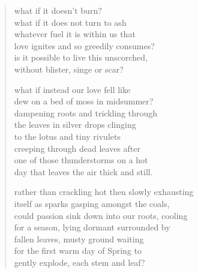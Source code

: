 \begin{verse}
what if it doesn't burn? \\
what if it does not turn to ash  \\
whatever fuel it is within us that  \\
love ignites and so greedily consumes? \\
is it possible to live this unscorched, \\
without blister, singe or scar? 

what if instead our love fell like \\
dew on a bed of moss in midsummer? \\
dampening roots and trickling through \\
the leaves in silver drops clinging  \\
to the lotus and tiny rivulets \\
creeping through dead leaves after  \\
one of those thunderstorms on a hot \\
day that leaves the air thick and still. 

rather than crackling hot then slowly exhausting \\
itself as sparks gasping amongst the coals, \\
could passion sink down into our roots, cooling \\
for a season, lying dormant surrounded by \\
fallen leaves, musty ground waiting  \\
for the first warm day of Spring to \\
gently explode, each stem and leaf?
\end{verse}
